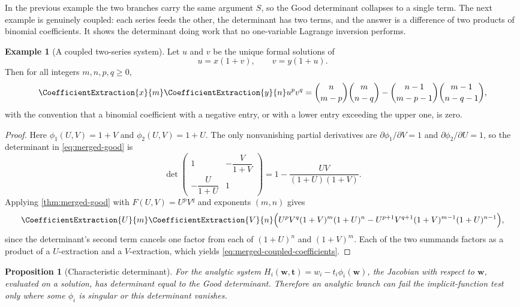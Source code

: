 \documentclass[11pt,a4paper,oneside,openany]{book}
\newtheorem{proposition}[theorem]{Proposition}
\theoremstyle{definition}
\newtheorem{example}[theorem]{Example}
\theoremstyle{remark}
\begin{document}
In the previous example the two branches carry the same argument $S$, so the
Good determinant collapses to a single term.  The next example is genuinely
coupled: each series feeds the other, the determinant has two terms, and the
answer is a difference of two products of binomial coefficients.  It shows the
determinant doing work that no one-variable Lagrange inversion performs.

\begin{example}[A coupled two-series system]\label{ex:merged-coupled-pair}
Let $u$ and $v$ be the unique formal solutions of
\begin{equation}
 u=x(1+v),\qquad v=y(1+u).                                        \label{eq:merged-coupled-system}
\end{equation}
Then for all integers $m,n,p,q\geq0$,
\begin{equation}
 \CoefficientExtraction{x}{m}\CoefficientExtraction{y}{n}u^pv^q
 =\binom{n}{m-p}\binom{m}{n-q}
  -\binom{n-1}{m-p-1}\binom{m-1}{n-q-1},                          \label{eq:merged-coupled-coefficients}
\end{equation}
with the convention that a binomial coefficient with a negative entry, or with
a lower entry exceeding the upper one, is zero.
\end{example}

\begin{proof}
Here $\phi_1(U,V)=1+V$ and $\phi_2(U,V)=1+U$.  The only nonvanishing partial
derivatives are $\partial\phi_1/\partial V=1$ and
$\partial\phi_2/\partial U=1$, so the determinant in \eqref{eq:merged-good} is
\[
 \det\begin{pmatrix}
  1 & -\dfrac{V}{1+V}\\[6pt]
  -\dfrac{U}{1+U} & 1
 \end{pmatrix}
 =1-\frac{UV}{(1+U)(1+V)}.
\]
Applying \cref{thm:merged-good} with $F(U,V)=U^pV^q$ and exponents $(m,n)$
gives
\[
 \CoefficientExtraction{U}{m}\CoefficientExtraction{V}{n}\Bigl(
   U^pV^q(1+V)^m(1+U)^n
   -U^{p+1}V^{q+1}(1+V)^{m-1}(1+U)^{n-1}\Bigr),
\]
since the determinant's second term cancels one factor from each of
$(1+U)^n$ and $(1+V)^m$.  Each of the two summands factors as a product of a
$U$-extraction and a $V$-extraction, which yields
\eqref{eq:merged-coupled-coefficients}.
\end{proof}

\begin{proposition}[Characteristic determinant]
\label{prop:merged-characteristic}
For the analytic system $H_i(\bm w,\bm t)=w_i-t_i\phi_i(\bm w)$, the Jacobian
with respect to $\bm w$, evaluated on a solution, has determinant equal to the
Good determinant.  Therefore an analytic branch can fail the implicit-function
test only where some $\phi_i$ is singular or this determinant vanishes.
\end{proposition}
\end{document}
